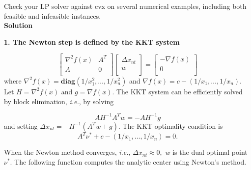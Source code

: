 \documentclass{article}
\begin{document}
Check your LP solver against cvx on several numerical examples, including both feasible and infeasible instances.\\

\textbf{Solution}

\textbf{1. The Newton step is defined by the KKT system}

$$
\begin{bmatrix} 
	\nabla ^2 f(x) & A^T \\
	A & 0\\
\end{bmatrix}
\begin{bmatrix} 
	\Delta x_{nt} \\
	w\\
\end{bmatrix} =
\begin{bmatrix} 
	- \nabla f(x) \\
	0\\
\end{bmatrix}
$$
where 
$\nabla ^2 f(x) = \mathbf{diag}(1/x_1^2, \dots, 1/x_n^2)$ 
and
$\nabla f(x) = c - (1/x_1, \dots, 1/x_n).$
Let $H = \nabla ^2 f(x)$ and $g = \nabla f(x).$
The KKT system can be efficiently solved by block elimination, \textit{i.e.}, by solving 

$$
A H^{-1}A^T w = - AH^{-1}g
$$
and setting $\Delta x_{nt} = - H^{-1}(A^Tw + g).$
The KKT optimality condition is 
$$
A^T \nu^* + c - (1/x_1, \dots, 1/x_n) = 0.
$$

When the Newton method converges, \textit{i.e.}, 
$\Delta x_{nt} \approx 0,$ $w$ is the dual optimal point $\nu^*.$
The following function computes the analytic center using Newton’s method. 
\end{document}
